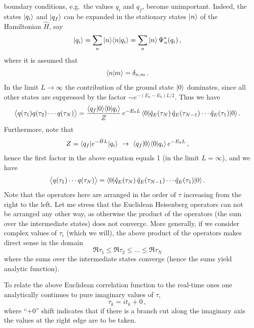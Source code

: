 boundary conditions, e.g.\ the values $q_i$ and $q_f$, become unimportant.
Indeed, the states $|q_i\rangle$ and $|q_f\rangle$ can be expanded in the
stationary states $|n\rangle$ of the Hamiltonian $\hat H$, say
\[
|q_i\rangle=\sum_n|n\rangle\langle n|q_i\rangle=\sum_n|n\rangle\,\Psi_n^*(q_i)\,,
\]
where it is assumed that
\[
\langle n|m\rangle=\delta_{n,m}\,.
\]
In the limit $L\to\infty$ the contribution of the ground state $|0\rangle$
dominates, since all other states are suppressed by the factor
$\sim e^{-(E_n-E_0)L/2}$. Thus we have
\[
\bigl\langle q(\tau_1)q(\tau_2)\cdots q(\tau_N)\bigr\rangle=\frac{\langle q_f|0\rangle\langle 0|q_i\rangle}{Z}\,e^{-E_0L}\,
\langle 0|\hat q_E(\tau_N)\,\hat q_E(\tau_{N-1})\cdots\hat q_E(\tau_1)|0\rangle\,.
\]
Furthermore, note that
\[
Z=\bra{q_f}e^{-\hat HL}\ket{q_i}\ \to\ \braket{q_f}{0}\braket{0}{q_i}\,e^{-E_0L}\,,
\]
hence the first factor in the above equation equals 1 (in the limit
$L=\infty$), and we have
\[
\bigl\langle q(\tau_1)\cdots q(\tau_N)\bigr\rangle=\langle 0|\hat q_E(\tau_N)\,\hat q_E(\tau_{N-1})\cdots\hat q_E(\tau_1)|0\rangle\,.
\]
Note that the operators here are arranged in the order of $\tau$ increasing
from the right to the left. Let me stress that the Euclidean Heisenberg
operators can not be arranged any other way, as otherwise the product of the
operators (the sum over the intermediate states) does not converge. More
generally, if we consider complex values of $\tau_i$ (which we will), the above
product of the operators makes direct sense in the domain
\[
\Re\tau_1\le\Re\tau_2\le\dots\le\Re\tau_N
\]
where the sums over the intermediate states converge (hence the sums yield
analytic function).

To relate the above Euclidean correlation function to the real-time ones one
analytically continues to pure imaginary values of $\tau$,
\[
\tau_k=it_k+0\,,
\]
where ``$+0$'' shift indicates that if there is a branch cut along the
imaginary axis the values at the right edge are to be taken.

